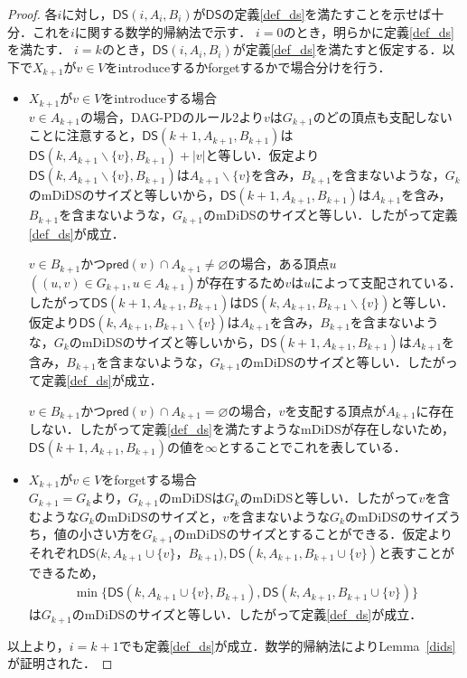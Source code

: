 \documentclass[master]{kuisthesis}		%
\theoremstyle{plain}
\theoremstyle{definition}
\begin{document}
\begin{proof}
    各$i$に対し，$\mathsf{DS}(i, A_i, B_i)$が$\mathsf{DS}$の定義\ref{def_ds}を満たすことを示せば十分．これを$i$に関する数学的帰納法で示す．
    $i=0$のとき，明らかに定義\ref{def_ds}を満たす．
    $i=k$のとき，$\mathsf{DS}(i, A_i, B_i)$が定義\ref{def_ds}を満たすと仮定する．以下で$X_{k+1}$が$v \in V$をintroduceするかforgetするかで場合分けを行う．
    \begin{itemize}
        \item $X_{k+1}$が$v \in V$をintroduceする場合 \\
        $v \in A_{k+1}$の場合，DAG-PDのルール2より$v$は$G_{k+1}$のどの頂点も支配しないことに注意すると，$\mathsf{DS}(k+1, A_{k+1}, B_{k+1})$は$\mathsf{DS}(k, A_{k+1} \backslash \{v\}, B_{k+1}) + |{v}|$と等しい．仮定より$\mathsf{DS}(k, A_{k+1} \backslash \{v\}, B_{k+1})$は$A_{k+1} \backslash \{v\}$を含み，$B_{k+1}$を含まないような，$G_k$のmDiDSのサイズと等しいから，$\mathsf{DS}(k+1, A_{k+1}, B_{k+1})$は$A_{k+1}$を含み，$B_{k+1}$を含まないような，$G_{k+1}$のmDiDSのサイズと等しい．したがって定義\ref{def_ds}が成立．
        
        $v \in B_{k+1}$かつ$\mathsf{pred}(v) \cap A_{k+1} \neq \varnothing$の場合，ある頂点$u$ $((u, v) \in G_{k+1}, u \in A_{k+1})$が存在するため$v$は$u$によって支配されている．したがって$\mathsf{DS}(k+1, A_{k+1}, B_{k+1})$は$\mathsf{DS}(k, A_{k+1}, B_{k+1} \backslash \{v\})$と等しい．仮定より$\mathsf{DS}(k, A_{k+1}, B_{k+1} \backslash \{v\})$は$A_{k+1}$を含み，$B_{k+1}$を含まないような，$G_k$のmDiDSのサイズと等しいから，$\mathsf{DS}(k+1, A_{k+1}, B_{k+1})$は$A_{k+1}$を含み，$B_{k+1}$を含まないような，$G_{k+1}$のmDiDSのサイズと等しい．したがって定義\ref{def_ds}が成立．

        $v \in B_{k+1}$かつ$\mathsf{pred}(v) \cap A_{k+1} = \varnothing$の場合，$v$を支配する頂点が$A_{k+1}$に存在しない．したがって定義\ref{def_ds}を満たすようなmDiDSが存在しないため，$\mathsf{DS}(k+1, A_{k+1}, B_{k+1})$の値を$\infty$とすることでこれを表している．
        
        \item $X_{k+1}$が$v \in V$をforgetする場合 \\
        $G_{k+1} = G_k$より，$G_{k+1}$のmDiDSは$G_k$のmDiDSと等しい．したがって$v$を含むような$G_k$のmDiDSのサイズと，$v$を含まないような$G_k$のmDiDSのサイズうち，値の小さい方を$G_{k+1}$のmDiDSのサイズとすることができる．仮定よりそれぞれ$\mathsf{DS}(k, A_{k+1} \cup \{v\}$，$B_{k+1}), \mathsf{DS}(k, A_{k+1}, B_{k+1} \cup \{v\})$と表すことができるため，
        \begin{align*}
            \min \{\mathsf{DS}(k, A_{k+1} \cup \{v\}, B_{k+1}), \mathsf{DS}(k, A_{k+1}, B_{k+1} \cup \{v\})\}
        \end{align*}
        は$G_{k+1}$のmDiDSのサイズと等しい．したがって定義\ref{def_ds}が成立．
    \end{itemize}
    以上より，$i = k+1$でも定義\ref{def_ds}が成立．数学的帰納法によりLemma~\ref{dids}が証明された．
\end{proof}
\end{document}
